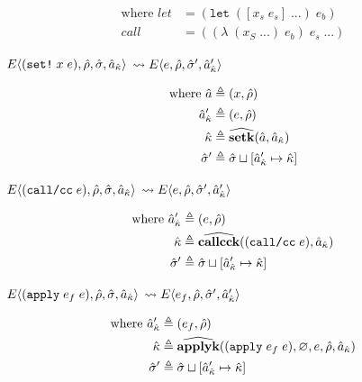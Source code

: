 \documentclass[12pt,draft]{article}
\newcommand{\applysyn}[2]{(\texttt{apply}\;#1\;#2)}
\newcommand{\callccsyn}[1]{(\texttt{call/cc}\;#1)}
\newcommand{\setsyn}[2]{(\texttt{set!}\;#1\;#2)}
\newcommand{\E}[4]{E\langle #1 , #2 , #3 , #4 \rangle}
\begin{document}
\begin{multicols*}{2}
\begin{align*}
    \text{where }
    let &= (\texttt{let} \; ([x_s \; e_s] \; ...) \; e_b) \\
    call &= ((\lambda \; (x_S \; ...) \; e_b) \; e_s \; ...)
  \end{align*}
  \begin{center}
    $\E{\setsyn{x}{e}}{\aenv}{\astore}{\akaddr}$
    $\leadsto \E{e}{\aenv}{\astore'}{\akaddr'}$
  \end{center}
  \vspace{-7mm}
  \begin{align*}
    \text{where }
    \hat{a} &\triangleq (x , \hat{\rho}) \\
    \hat{a}_{\hat{\kappa}}' &\triangleq (e, \hat{\rho}) \\
    \hat{\kappa} &\triangleq \widehat{\textbf{setk}}(\hat{a} , \hat{a}_{\hat{\kappa}}) \\
    \hat{\sigma}' &\triangleq \hat{\sigma} \sqcup [\hat{a}_{\hat{\kappa}}' \mapsto \hat{\kappa}]
  \end{align*}
  \begin{center}
    $\E{\callccsyn{e}}{\aenv}{\astore}{\akaddr}$
    $\leadsto \E{e}{\aenv}{\astore'}{\akaddr'}$
  \end{center}
  \vspace{-7mm}
  \begin{align*}
    \text{where }
    \akaddr' &\triangleq (e , \aenv) \\
    \akont &\triangleq \acallcck{\callccsyn{e}}{\akaddr} \\
    \astore' &\triangleq \astore \sqcup [\akaddr' \mapsto \akont]
  \end{align*}
  \vfill\null
  \columnbreak
  \begin{center}
    $\E{\applysyn{e_f}{e}}{\aenv}{\astore}{\akaddr}$
    $\leadsto \E{e_f}{\aenv}{\astore'}{\akaddr'}$
  \end{center}
  \vspace{-7mm}
  \begin{align*}
    \text{where }
    \akaddr' &\triangleq (e_f , \aenv) \\
    \akont &\triangleq\aapplyk{\applysyn{e_f}{e}}{\varnothing}{e}{\aenv}{\akaddr} \\
    \astore' &\triangleq \astore \sqcup [\akaddr' \mapsto \akont]

\end{align*}
\end{multicols*}
\end{document}
